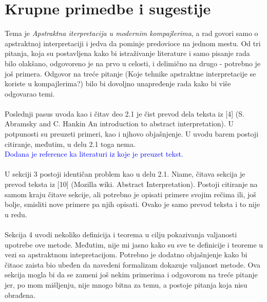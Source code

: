 \documentclass[a4paper]{report}
\newcommand{\odgovor}[1]{\textcolor{blue}{#1}}
\begin{document}
\section{Krupne primedbe i sugestije}
\label{sec: primedbe}
Tema je \textit{Apstraktna iterpretacija u modernim kompajlerima}, a rad govori samo o apstraktnoj interpretaciji i jedva da pominje predovioce na jednom mestu. Od tri pitanja, koja su postavljena kako bi istraživanje literature i samo pisanje rada bilo olakšano, odgovoreno je na prvo u celosti, i delimično na drugo - potrebno je još primera. Odgovor na treće pitanje (Koje tehnike apstraktne interpretacije se koriste u kompajlerima?) bilo bi dovoljno unapređenje rada kako bi više odgovarao temi.
\\
\\
Poslednji pasus uvoda kao i čitav deo 2.1 je čist prevod dela teksta iz [4] (S. Abramsky and C. Hankin An introduction to abstract interpretation). U potpunosti su preuzeti primeri, kao i njhovo objašnjenje. U uvodu barem postoji citiranje, međutim, u delu 2.1 toga nema.
\\
  \odgovor{Dodana je reference ka literaturi iz koje je preuzet tekst.}
\\
\\
U sekciji 3 postoji identičan problem kao u delu 2.1. Niame, čitava sekcija je prevod teksta iz [10] (Mozilla wiki. Abstract Interpretation). Postoji citiranje na samom kraju čitave sekcije, ali potrebno je opisati primere svojim rečima ili, još bolje, smisliti nove primere pa njih opisati. Ovako je samo prevod teksta i to nije u redu. 
\\
\\
Sekcija 4 uvodi nekoliko definicija i teorema u cilju pokazivanja valjanosti upotrebe ove metode. Međutim, nije mi jasno kako su sve te definicije i teoreme u vezi sa apstraktnom intepretacijom. Potrebno je dodatno objašnjenje kako bi čitaoc zaista bio ubeđen da navedeni formalizam dokazuje valjanost metode. Ova sekcija mogla bi da se zameni još nekim primerima i odgovorom na treće pitanje jer, po mom mišljenju, nije mnogo bitna za temu, a postoje pitanja koja nisu obrađena. 
\end{document}
